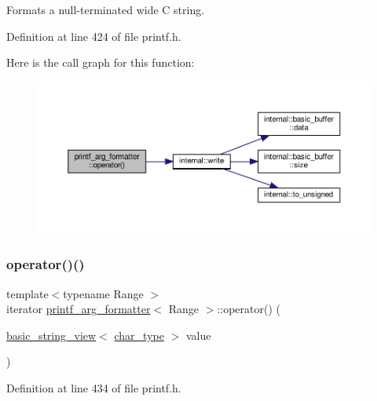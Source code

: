 Formats a null-\/terminated wide C string. 

Definition at line 424 of file printf.\+h.

Here is the call graph for this function\+:
\nopagebreak
\begin{figure}[H]
\begin{center}
\leavevmode
\includegraphics[width=350pt]{classprintf__arg__formatter_a880170cd3e3ace7546cb01268586ac77_cgraph}
\end{center}
\end{figure}
\mbox{\label{classprintf__arg__formatter_a5207b86409ce0aab09db50ae8200097e}} 
\subsubsection{\texorpdfstring{operator()()}{operator()()}\hspace{0.1cm}{\footnotesize\ttfamily [5/8]}}
{\footnotesize\ttfamily template$<$typename Range $>$ \\
iterator \hyperlink{classprintf__arg__formatter}{printf\+\_\+arg\+\_\+formatter}$<$ Range $>$\+::operator() (\begin{DoxyParamCaption}\item[{\hyperlink{classbasic__string__view}{basic\+\_\+string\+\_\+view}$<$ \hyperlink{classinternal_1_1arg__formatter__base_a407930bf282880d2ca45dfa8f5d2034b}{char\+\_\+type} $>$}]{value }\end{DoxyParamCaption})\hspace{0.3cm}{\ttfamily [inline]}}



Definition at line 434 of file printf.\+h.

\mbox{\label{classprintf__arg__formatter_ae4e5a2115e2770ef22b98b3329a5916a}} 
